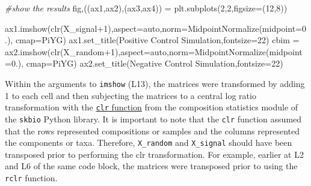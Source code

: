 \documentclass[
]{article}
\newenvironment{Shaded}{}{}
\newcommand{\CommentTok}[1]{\textcolor[rgb]{0.63,0.63,0.65}{\textit{#1}}}
\newcommand{\DecValTok}[1]{\textcolor[rgb]{0.60,0.41,0.00}{#1}}
\newcommand{\FloatTok}[1]{\textcolor[rgb]{0.60,0.41,0.00}{#1}}
\newcommand{\NormalTok}[1]{\textcolor[rgb]{0.22,0.23,0.26}{#1}}
\newcommand{\OperatorTok}[1]{\textcolor[rgb]{0.65,0.15,0.64}{#1}}
\newcommand{\StringTok}[1]{\textcolor[rgb]{0.31,0.63,0.31}{#1}}
\begin{document}
\begin{Shaded}
\begin{Highlighting}[numbers=left,,firstnumber=10,]
\CommentTok{\#show the results}
\NormalTok{fig,((ax1,ax2),(ax3,ax4)) }\OperatorTok{=}\NormalTok{ plt.subplots(}\DecValTok{2}\NormalTok{,}\DecValTok{2}\NormalTok{,figsize}\OperatorTok{=}\NormalTok{(}\DecValTok{12}\NormalTok{,}\DecValTok{8}\NormalTok{))}

\NormalTok{ax1.imshow(clr(X\_signal}\OperatorTok{+}\DecValTok{1}\NormalTok{),aspect}\OperatorTok{=}\StringTok{\textquotesingle{}auto\textquotesingle{}}\NormalTok{,norm}\OperatorTok{=}\NormalTok{MidpointNormalize(midpoint}\OperatorTok{=}\FloatTok{0.}\NormalTok{), cmap}\OperatorTok{=}\StringTok{\textquotesingle{}PiYG\textquotesingle{}}\NormalTok{)}
\NormalTok{ax1.set\_title(}\StringTok{\textquotesingle{}Positive Control Simulation\textquotesingle{}}\NormalTok{,fontsize}\OperatorTok{=}\DecValTok{22}\NormalTok{)}
\NormalTok{cbim }\OperatorTok{=}\NormalTok{ ax2.imshow(clr(X\_random}\OperatorTok{+}\DecValTok{1}\NormalTok{),aspect}\OperatorTok{=}\StringTok{\textquotesingle{}auto\textquotesingle{}}\NormalTok{,norm}\OperatorTok{=}\NormalTok{MidpointNormalize(midpoint}\OperatorTok{=}\FloatTok{0.}\NormalTok{), cmap}\OperatorTok{=}\StringTok{\textquotesingle{}PiYG\textquotesingle{}}\NormalTok{)}
\NormalTok{ax2.set\_title(}\StringTok{\textquotesingle{}Negative Control Simulation\textquotesingle{}}\NormalTok{,fontsize}\OperatorTok{=}\DecValTok{22}\NormalTok{)}
\end{Highlighting}
\end{Shaded}

\normalsize{}

Within the arguments to \texttt{imshow} (L13), the matrices were
transformed by adding 1 to each cell and then subjecting the matrices to
a central log ratio transformation with the
\href{https://scikit.bio/docs/dev/generated/skbio.stats.composition.clr.html\#skbio.stats.composition.clr}{\texttt{clr}
function} from the composition statistics module of the \texttt{skbio}
Python library. It is important to note that the \texttt{clr} function
assumed that the rows represented compositions or samples and the
columns represented the components or taxa. Therefore,
\texttt{X\_random} and \texttt{X\_signal} should have been transposed
prior to performing the clr transformation. For example, earlier at L2
and L6 of the same code block, the matrices were transposed prior to
using the \texttt{rclr} function.

\footnotesize
\end{document}
